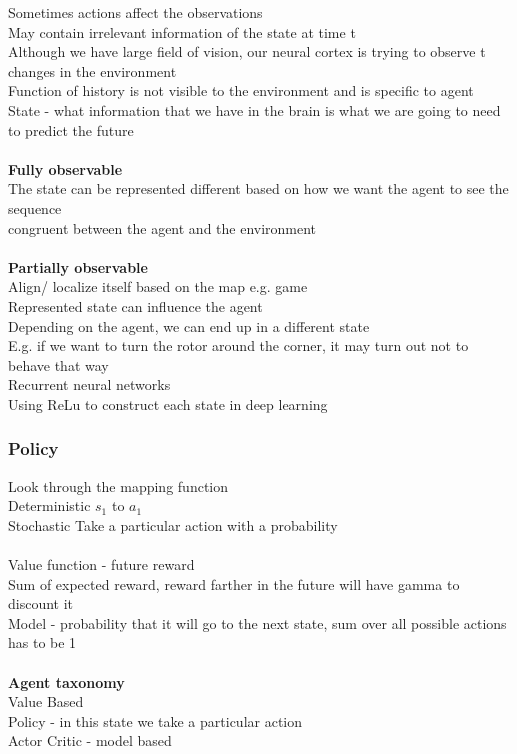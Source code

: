 \documentclass[11pt]{article}
\begin{document}
Sometimes actions affect the observations\\
May contain irrelevant information of the state at time t\\
Although we have large field of vision, our neural cortex is trying to observe t changes in the environment\\
Function of history is not visible to the environment and is specific to agent\\
State - what information that we have in the brain is what we are going to need to predict the future\\
\\
\textbf{Fully observable}\\
The state can be represented different based on how we want the agent to see the sequence\\
congruent between the agent and the environment\\
\\
\textbf{Partially observable}\\
Align/ localize itself based on the map e.g. game
\\
Represented state can influence the agent
\\
Depending on the agent, we can end up in a different state\\
E.g. if we want to turn the rotor around the corner, it may turn out not to behave that way
\\
Recurrent neural networks\\
Using ReLu to construct each state in deep learning
\subsubsection*{Policy}
Look through the mapping function\\
Deterministic $s_{1}$ to $a_{1}$ \\
Stochastic Take a particular action with a probability\\
\\
Value function - future reward\\
Sum of expected reward, reward farther in the future will have gamma to discount it\\
Model - probability that it will go to the next state, sum over all possible actions has to be 1
\\\\
\textbf{Agent taxonomy}\\
Value Based\\
Policy - in this state we take a particular action\\
Actor Critic - model based
\\
\end{document}
